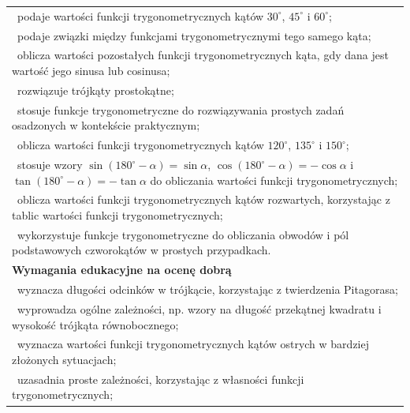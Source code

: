 \documentclass[12pt,a4paper]{article}
\begin{document}
\begin{longtable}{|p{16cm}|}
		\textbullet\ podaje wartości funkcji trygonometrycznych kątów $30^\circ$, $45^\circ$ i $60^\circ$; \\
		
		\textbullet\ podaje związki między funkcjami trygonometrycznymi tego samego kąta; \\
		
		\textbullet\ oblicza wartości pozostałych funkcji trygonometrycznych kąta, gdy dana jest wartość jego sinusa lub cosinusa; \\
		
		\textbullet\ rozwiązuje trójkąty prostokątne; \\
		
		\textbullet\ stosuje funkcje trygonometryczne do rozwiązywania prostych zadań osadzonych w kontekście praktycznym; \\
		
		\textbullet\ oblicza wartości funkcji trygonometrycznych kątów $120^\circ$, $135^\circ$ i $150^\circ$; \\
		
		\textbullet\ stosuje wzory $\sin(180^\circ-\alpha)=\sin\alpha$, $\cos(180^\circ-\alpha)=-\cos\alpha$ i $\tan(180^\circ-\alpha)=-\tan\alpha$ do obliczania wartości funkcji trygonometrycznych; \\
		
		\textbullet\ oblicza wartości funkcji trygonometrycznych kątów rozwartych, korzystając z tablic wartości funkcji trygonometrycznych; \\
		
		\textbullet\ wykorzystuje funkcje trygonometryczne do obliczania obwodów i pól podstawowych czworokątów w prostych przypadkach. \\ \hline
		
		\textbf{Wymagania edukacyjne na ocenę dobrą} \\ \hline
		
		\textbullet\ wyznacza długości odcinków w trójkącie, korzystając z twierdzenia Pitagorasa; \\
		
		\textbullet\ wyprowadza ogólne zależności, np. wzory na długość przekątnej kwadratu i wysokość trójkąta równobocznego; \\
		
		\textbullet\ wyznacza wartości funkcji trygonometrycznych kątów ostrych w bardziej złożonych sytuacjach; \\
		
		\textbullet\ uzasadnia proste zależności, korzystając z własności funkcji trygonometrycznych; \\
		

\end{longtable}
\end{document}
